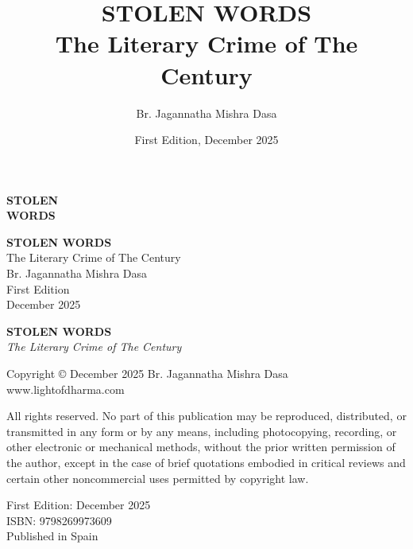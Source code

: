 \documentclass[12pt,twoside]{book}
\author{Br. Jagannatha Mishra Dasa}
\date{First Edition, December 2025}
\title{STOLEN WORDS\\\medskip
\large The Literary Crime of The Century}
\begin{document}
\thispagestyle{empty}
\vspace*{0.22\textheight}
\begin{center}
{\fontsize{40}{48}\selectfont\textbf{STOLEN}}\\[0.6cm]
{\fontsize{40}{48}\selectfont\textbf{WORDS}}
\end{center}
\vspace*{\fill}
\clearpage

\thispagestyle{empty}
\mbox{}
\newpage

\thispagestyle{empty}
\vspace*{0.18\textheight}
\begin{center}
{\fontsize{36}{42}\selectfont\textbf{STOLEN WORDS}}\\[0.5cm]
{\large The Literary Crime of The Century}\\
\vspace{0.15\textheight}
{\Large Br. Jagannatha Mishra Dasa}\\
\vspace*{\fill}
{\normalsize First Edition}\\[0.3cm]
{\normalsize December 2025}\\[1cm]
\end{center}
\clearpage

\thispagestyle{empty}
\textbf{STOLEN WORDS}\\
\emph{The Literary Crime of The Century}

Copyright © December 2025 Br. Jagannatha Mishra Dasa\\
www.lightofdharma.com

All rights reserved. No part of this publication may be reproduced, distributed, or transmitted in any form or by any means, including photocopying, recording, or other electronic or mechanical methods, without the prior written permission of the author, except in the case of brief quotations embodied in critical reviews and certain other noncommercial uses permitted by copyright law.

\vspace*{\fill}

First Edition: December 2025\\
ISBN: 9798269973609\\
Published in Spain

\clearpage

\thispagestyle{empty}
{\let\clearpage\relax\tableofcontents}

\clearpage
\end{document}
